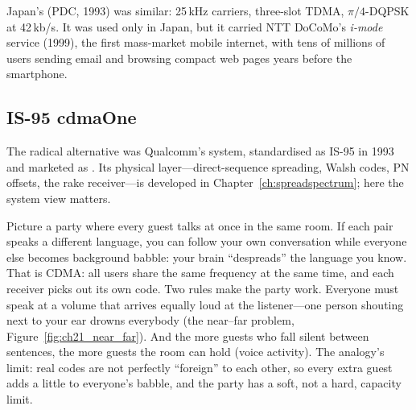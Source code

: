 Japan's  (PDC, 1993) was similar: 25\,kHz carriers, three-slot TDMA,
$\pi/4$-DQPSK at 42\,kb/s. It was used only in Japan, but it carried NTT DoCoMo's \emph{i-mode}
service (1999), the first mass-market mobile internet, with tens of millions of users sending email
and browsing compact web pages years before the smartphone.

\subsection{IS-95 cdmaOne}

The radical alternative was Qualcomm's  system, standardised as
IS-95 in 1993 and marketed as . Its physical layer---direct-sequence spreading, Walsh
codes, PN offsets, the rake receiver---is developed in Chapter~\ref{ch:spreadspectrum}; here the
system view matters.


\begin{analogy}
Picture a party where every guest talks at once in the same room. If each pair speaks a different
language, you can follow your own conversation while everyone else becomes background babble: your
brain ``despreads'' the language you know. That is CDMA: all users share the same frequency at the
same time, and each receiver picks out its own code. Two rules make the party work. Everyone must
speak at a volume that arrives equally loud at the listener---one person shouting next to your ear
drowns everybody (the near--far problem, Figure~\ref{fig:ch21_near_far}). And the more guests who
fall silent between sentences, the more guests the room can hold (voice activity). The analogy's
limit: real codes are not perfectly ``foreign'' to each other, so every extra guest adds a little to
everyone's babble, and the party has a soft, not a hard, capacity limit.
\end{analogy}


